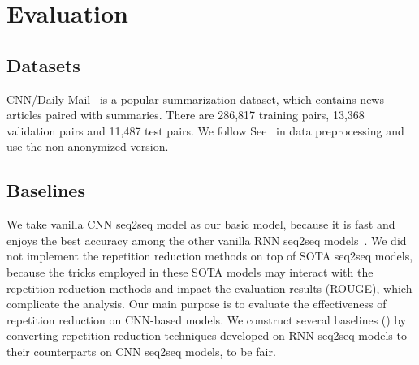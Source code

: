 \section{Evaluation}
\label{sec:eval}

\subsection{Datasets}
CNN/Daily Mail~\cite{HermannKGEKSB15}
is a popular summarization dataset, 
which contains news articles paired with summaries.
There are 286,817 training pairs,
13,368 validation pairs and 11,487 test pairs.
We follow See~ in data preprocessing and use 
the non-anonymized version. 

\subsection{Baselines}
We take vanilla CNN seq2seq model as our basic model,
because it is fast and enjoys the best accuracy among
the other vanilla RNN seq2seq models~\cite{bai2018empirical,gehring2017convs2s}.
We did not implement the repetition reduction methods 
on top of SOTA seq2seq models,
because the tricks employed in these SOTA models may 
interact with the repetition reduction methods 
and impact the evaluation results (ROUGE), which complicate the analysis.
Our main purpose is to evaluate the effectiveness of repetition reduction
on CNN-based models.
We construct several baselines () 
by converting
repetition reduction techniques developed on RNN seq2seq models to their
counterparts on CNN seq2seq models,
to be fair.

